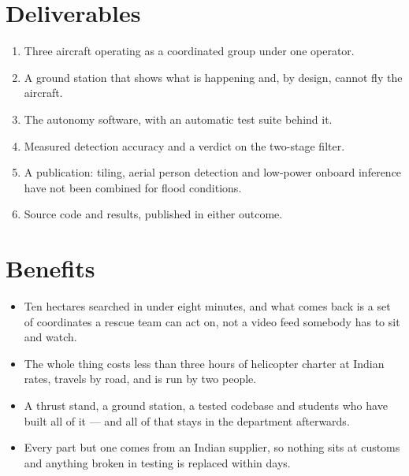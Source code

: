 \documentclass[11pt,a4paper]{article}
\begin{document}
\section{Deliverables}

\begin{enumerate}\itemsep0pt
\item Three aircraft operating as a coordinated group under one operator.
\item A ground station that shows what is happening and, by design, cannot fly
the aircraft.
\item The autonomy software, with an automatic test suite behind it.
\item Measured detection accuracy and a verdict on the two-stage filter.
\item A publication: tiling, aerial person detection and low-power onboard
inference have not been combined for flood conditions.
\item Source code and results, published in either outcome.
\end{enumerate}

\section{Benefits}

\begin{itemize}\itemsep2pt
\item Ten hectares searched in under eight minutes, and what comes back is a
set of coordinates a rescue team can act on, not a video feed somebody has to
sit and watch.
\item The whole thing costs less than three hours of helicopter charter at
Indian rates, travels by road, and is run by two people.
\item A thrust stand, a ground station, a tested codebase and students who have
built all of it --- and all of that stays in the department afterwards.
\item Every part but one comes from an Indian supplier, so nothing sits at
customs and anything broken in testing is replaced within days.
\end{itemize}
\end{document}
